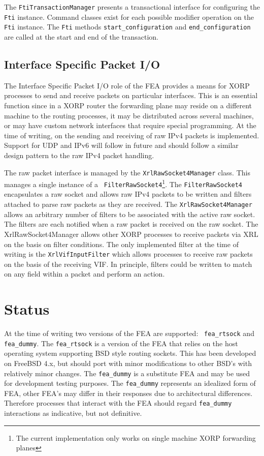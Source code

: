 \documentclass[11pt]{article}
\begin{document}
The {\tt FtiTransactionManager} presents a transactional interface for
configuring the {\tt Fti} instance.  Command classes exist for each
possible modifier operation on the {\tt Fti} instance.  The {\tt Fti}
methods {\tt start\_configuration} and {\tt end\_configuration} are
called at the start and end of the transaction.

\subsection{Interface Specific Packet I/O}

The Interface Specific Packet I/O role of the FEA provides a means for
XORP processes to send and receive packets on particular interfaces.
This is an essential function since in a XORP router the forwarding
plane may reside on a different machine to the routing processes, it
may be distributed across several machines, or may have custom network
interfaces that require special programming.  At the time of writing,
on the sending and receiving of raw IPv4 packets is implemented.
Support for UDP and IPv6 will follow in future and should follow a
similar design pattern to the raw IPv4 packet handling.

The raw packet interface is managed by the {\tt XrlRawSocket4Manager}
class.  This manages a single instance of a {\tt
FilterRawSocket4}\footnote{The current implementation only works on
single machine XORP forwarding planes}.  The {\tt FilterRawSocket4}
encapsulates a raw socket and allows raw IPv4 packets to be written
and filters attached to parse raw packets as they are received.  The
{\tt XrlRawSocket4Manager} allows an arbitrary number of filters to be
associated with the active raw socket.  The filters are each notified
when a raw packet is received on the raw socket.  The
XrlRawSocket4Manager allows other XORP processes to receive packets
via XRL on the basis on filter conditions.  The only implemented
filter at the time of writing is the {\tt XrlVifInputFilter} which
allows processes to receive raw packets on the basis of the receiving
VIF.  In principle, filters could be written to match on any field
within a packet and perform an action.

\section{Status}

At the time of writing two versions of the FEA are supported: {\tt
fea\_rtsock} and {\tt fea\_dummy}.  The {\tt fea\_rtsock} is a version
of the FEA that relies on the host operating system supporting BSD
style routing sockets.  This has been developed on FreeBSD 4.x, but
should port with minor modifications to other BSD's with relatively
minor changes.  The {\tt fea\_dummy} is a substitute FEA and may be
used for development testing purposes.  The {\tt fea\_dummy}
represents an idealized form of FEA, other FEA's may differ in their
responses due to architectural differences.  Therefore processes that
interact with the FEA should regard {\tt fea\_dummy} interactions as
indicative, but not definitive.
\end{document}
